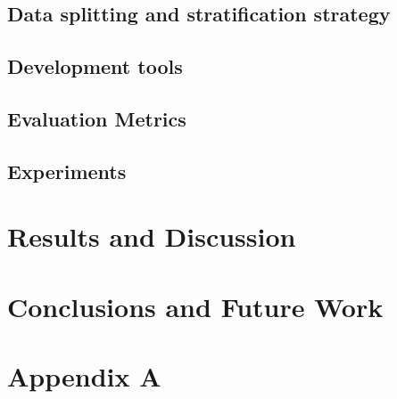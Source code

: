 \documentclass[a4paper,10pt]{book}
\begin{document}
\section{Data splitting and stratification strategy}
\section{Development tools}
\section{Evaluation Metrics}
\section{Experiments}

\chapter{Results and Discussion}
\chapter{Conclusions and Future Work}

\chapter{Appendix A}

\backmatter
{}


\end{document}
